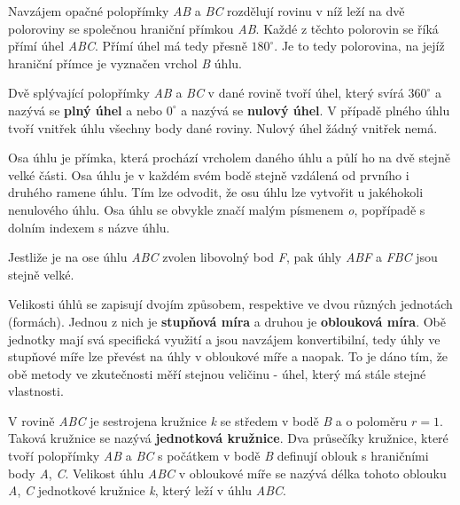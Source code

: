 \vskip 4mm
\centerline{}
\vskip 4mm

Navzájem opačné polopřímky {\it AB} a {\it BC} rozdělují rovinu v níž leží na dvě poloroviny se společnou hraniční přímkou {\it AB}. Každé z těchto polorovin se říká přímí úhel {\it ABC}. Přímí úhel má tedy přesně  $180^\circ$. Je to tedy polorovina, na jejíž hraniční přímce je vyznačen vrchol {\it B} úhlu.

\vskip 4mm
\centerline{}
\vskip 4mm

Dvě splývající polopřímky {\it AB} a {\it BC} v dané rovině tvoří úhel, který svírá $360^\circ$ a nazývá se {\bf plný úhel} a nebo $0^\circ$ a nazývá se {\bf nulový úhel}. V případě plného úhlu tvoří vnitřek úhlu všechny body dané roviny. Nulový úhel žádný vnitřek nemá. 

\vskip 4mm
\centerline{}
\vskip 4mm


Osa úhlu je přímka, která prochází vrcholem daného úhlu a půlí ho na dvě stejně velké části. Osa úhlu je v každém svém bodě stejně vzdálená od prvního i druhého ramene úhlu. Tím lze odvodit, že osu úhlu lze vytvořit u jakéhokoli nenulového úhlu. Osa úhlu se obvykle značí malým písmenem {\it o}, popřípadě s dolním indexem s názve úhlu.

Jestliže je na ose úhlu {\it ABC} zvolen libovolný bod {\it F}, pak úhly {\it ABF} a {\it FBC} jsou stejně velké.

\vskip 4mm
\centerline{}
\vskip 4mm


Velikosti úhlů se zapisují dvojím způsobem, respektive ve dvou různých jednotách (formách). Jednou z nich je {\bf stupňová míra} a druhou je {\bf oblouková míra}. Obě jednotky mají svá specifická využití a jsou navzájem konvertibilní, tedy úhly ve stupňové míře lze převést na úhly v obloukové míře a naopak. To je dáno tím, že obě metody ve zkutečnosti měří stejnou veličinu - úhel, který má stále stejné vlastnosti.


V rovině {\it ABC} je sestrojena kružnice {\it k} se středem v bodě {\it B} a o poloměru $r=1$. Taková kružnice se nazývá {\bf jednotková kružnice}. Dva průsečíky kružnice, které tvoří polopřímky {\it AB} a {\it BC} s počátkem v bodě {\it B} definují oblouk s hraničními body {\it A}, {\it C}. Velikost úhlu {\it ABC} v obloukové míře se nazývá délka tohoto oblouku {\it A}, {\it C} jednotkové kružnice {\it k}, který leží v úhlu {\it ABC}. 

